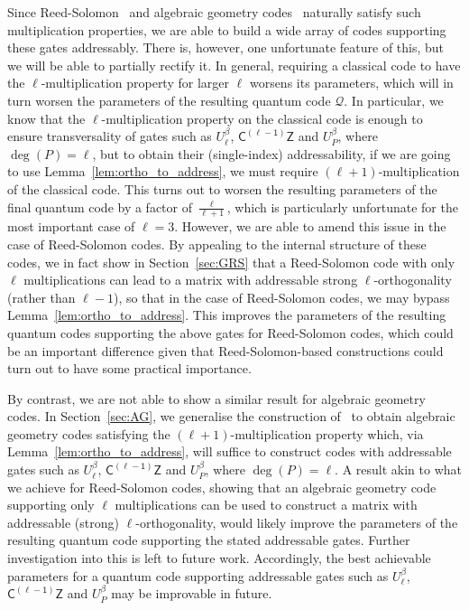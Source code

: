\documentclass[11pt]{article}
\theoremstyle{definition}
\newcommand{\CLZ}{\mathsf{C^{(\ell-1)}Z}}
\newcommand{\qcode}{\mathcal{Q}}
\begin{document}
Since Reed-Solomon~\cite{reed1960polynomial} and algebraic geometry codes~\cite{goppa1982algebraico} naturally satisfy such multiplication properties, we are able to build a wide array of codes supporting these gates addressably. There is, however, one unfortunate feature of this, but we will be able to partially rectify it. In general, requiring a classical code to have the $\ell$-multiplication property for larger $\ell$ worsens its parameters, which will in turn worsen the parameters of the resulting quantum code $\qcode$. In particular, we know that the $\ell$-multiplication property on the classical code is enough to ensure transversality of gates such as $U_\ell^\beta$, $\CLZ$ and $U_P^\beta$, where $\deg(P) = \ell$, but to obtain their (single-index) addressability, if we are going to use Lemma~\ref{lem:ortho_to_address}, we must require $(\ell+1)$-multiplication of the classical code. This turns out to worsen the resulting parameters of the final quantum code by a factor of $\frac{\ell}{\ell+1}$, which is particularly unfortunate for the most important case of $\ell = 3$. However, we are able to amend this issue in the case of Reed-Solomon codes. By appealing to the internal structure of these codes, we in fact show in Section~\ref{sec:GRS} that a Reed-Solomon code with only $\ell$ multiplications can lead to a matrix with addressable strong $\ell$-orthogonality (rather than $\ell-1$), so that in the case of Reed-Solomon codes, we may bypass Lemma~\ref{lem:ortho_to_address}. This improves the parameters of the resulting quantum codes supporting the above gates for Reed-Solomon codes, which could be an important difference given that Reed-Solomon-based constructions could turn out to have some practical importance.

By contrast, we are not able to show a similar result for algebraic geometry codes. In Section~\ref{sec:AG}, we generalise the construction of~\cite{wills2024constant} to obtain algebraic geometry codes satisfying the $(\ell+1)$-multiplication property which, via Lemma~\ref{lem:ortho_to_address}, will suffice to construct codes with addressable gates such as $U_{\ell}^\beta$, $\CLZ$ and $U_P^\beta$, where $\deg(P) = \ell$. A result akin to what we achieve for Reed-Solomon codes, showing that an algebraic geometry code supporting only $\ell$ multiplications can be used to construct a matrix with addressable (strong) $\ell$-orthogonality, would likely improve the parameters of the resulting quantum code supporting the stated addressable gates. 
Further investigation into this is left to future work. Accordingly, the best achievable parameters for a quantum code supporting addressable gates such as $U_\ell^\beta$, $\CLZ$ and $U_P^\beta$ may be improvable in future. 
\end{document}
